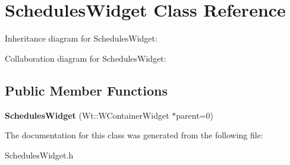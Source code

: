 \hypertarget{classSchedulesWidget}{}\section{Schedules\+Widget Class Reference}
\label{classSchedulesWidget}


Inheritance diagram for Schedules\+Widget\+:


Collaboration diagram for Schedules\+Widget\+:
\subsection*{Public Member Functions}
\begin{DoxyCompactItemize}
\item 
\mbox{\label{classSchedulesWidget_af9067716d758b83ab2bbdf1f1fd98be2}} 
{\bfseries Schedules\+Widget} (Wt\+::\+W\+Container\+Widget $\ast$parent=0)
\end{DoxyCompactItemize}


The documentation for this class was generated from the following file\+:\begin{DoxyCompactItemize}
\item 
Schedules\+Widget.\+h\end{DoxyCompactItemize}

